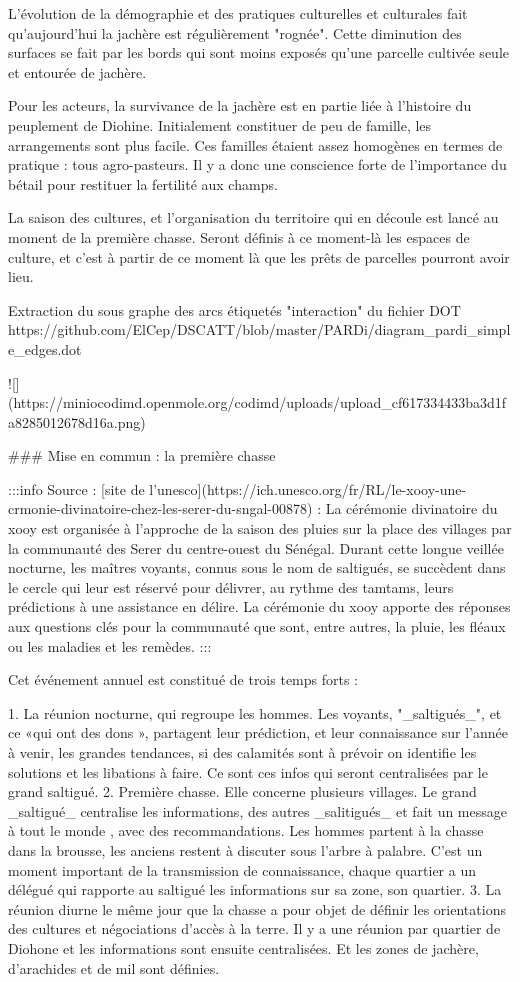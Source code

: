 L'évolution de la démographie et des pratiques culturelles et culturales fait qu'aujourd'hui la jachère est régulièrement "rognée". Cette diminution des surfaces se fait par les bords qui sont moins exposés qu'une parcelle cultivée seule et entourée de jachère. 

Pour les acteurs, la survivance de la jachère est en partie liée à l'histoire du peuplement de Diohine. Initialement constituer de peu de famille, les arrangements sont plus facile. Ces familles étaient assez homogènes en termes de pratique : tous agro-pasteurs. Il y a donc une conscience forte de l'importance du bétail pour restituer la fertilité aux champs. 

La saison des cultures, et l'organisation du territoire qui en découle est lancé au moment de la première chasse. Seront définis à ce moment-là les espaces de culture, et c'est à partir de ce moment là que les prêts de parcelles pourront avoir lieu.

Extraction du sous graphe des arcs étiquetés  "interaction" du fichier DOT https://github.com/ElCep/DSCATT/blob/master/PARDi/diagram_pardi_simple_edges.dot 
 
![](https://miniocodimd.openmole.org/codimd/uploads/upload_cf617334433ba3d1fa8285012678d16a.png)
 
 ### Mise en commun : la première chasse
 
:::info 
Source : [site de l'unesco](https://ich.unesco.org/fr/RL/le-xooy-une-crmonie-divinatoire-chez-les-serer-du-sngal-00878) : 
La cérémonie divinatoire du xooy est organisée à l’approche de la saison des pluies sur la place des villages par la communauté des Serer du centre-ouest du Sénégal. Durant cette longue veillée nocturne, les maîtres voyants, connus sous le nom de saltigués, se succèdent dans le cercle qui leur est réservé pour délivrer, au rythme des tamtams, leurs prédictions à une assistance en délire. La cérémonie du xooy apporte des réponses aux questions clés pour la communauté que sont, entre autres, la pluie, les fléaux ou les maladies et les remèdes. 
:::

Cet événement annuel est constitué de trois temps forts : 

1. La réunion nocturne, qui regroupe les hommes. Les voyants, "_saltigués_", et ce «qui ont des dons », partagent leur prédiction, et leur connaissance sur l'année à venir, les grandes tendances, si des calamités sont à prévoir on identifie les solutions et les libations à faire. Ce sont ces infos qui seront centralisées par le grand saltigué.
2. Première chasse. Elle concerne plusieurs villages.  Le grand _saltigué_ centralise les informations, des autres _salitigués_ et fait un message à tout le monde , avec des recommandations. Les hommes partent à la chasse dans la brousse, les anciens restent à discuter sous l'arbre à palabre. C'est un moment important de la transmission de connaissance, chaque quartier a un délégué qui rapporte au saltigué les informations sur sa zone, son quartier. 
3. La réunion diurne le même jour que la chasse a pour objet de définir les orientations des cultures et négociations d'accès à la terre. Il y a une réunion par quartier de Diohone et les informations sont ensuite centralisées. Et les zones de jachère, d'arachides et de mil sont définies.


